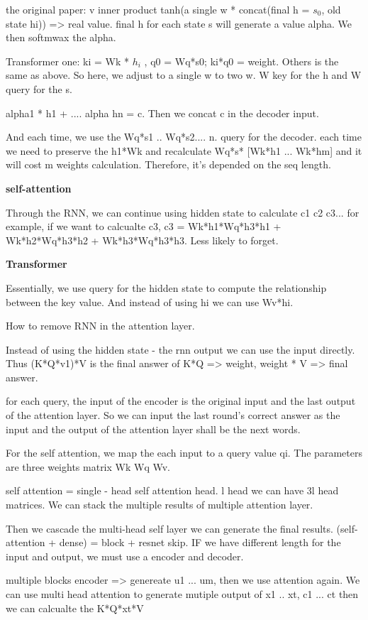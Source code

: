 \documentclass[UTF8]{article}
\begin{document}
the original paper: v inner product tanh(a single w * concat(final h = $s_0$, old state hi)) => real value. final h for each state s will generate a value alpha. We then softmwax the alpha.

Transformer one: ki = Wk * $h_i$ , q0 = Wq*s0;  ki*q0 = weight. Others is the same as above. So here, we adjust to a single w to two w. W key for the h and W query for the s.

alpha1 * h1 + .... alpha hn = c. Then we concat c in the decoder input.

And each time, we use the Wq*s1 .. Wq*s2.... n.  query for the decoder. each time we need to preserve the h1*Wk and recalculate Wq*s* [Wk*h1 ... Wk*hm] and it will cost m weights calculation. Therefore, it's depended on the seq length.

\textbf{self-attention}

Through the RNN, we can continue using hidden state to calculate c1 c2 c3... for example, if we want to calcualte c3, c3 = Wk*h1*Wq*h3*h1 + Wk*h2*Wq*h3*h2 + Wk*h3*Wq*h3*h3. Less likely to forget.

\textbf{Transformer}

Essentially, we use query for the hidden state to compute the relationship between the key value. And instead of using hi we can use Wv*hi.

How to remove RNN in the attention layer.

Instead of using the hidden state - the rnn output we can use the input directly. Thus (K*Q*v1)*V is the final answer of K*Q => weight, weight * V => final answer.

for each query, the input of the encoder is the original input and the last output of the attention layer.  So we can input the last round's correct answer as the input and the output of the attention layer shall be the next words. 

For the self attention, we map the each input to a query value qi.  The parameters are three weights matrix Wk Wq Wv.

self attention = single - head self attention head.  l head we can have 3l head matrices. We can stack the multiple results of multiple attention layer. 

Then we cascade the multi-head self layer we can generate the final results. (self-attention + dense) = block + resnet skip. IF we have different length for the input and output, we must use a encoder and decoder.

multiple blocks encoder => genereate u1 ... um, then we use attention again. We can use multi head attention to generate mutiple output of x1 .. xt, c1 ... ct then we can calcualte the K*Q*xt*V
\end{document}
